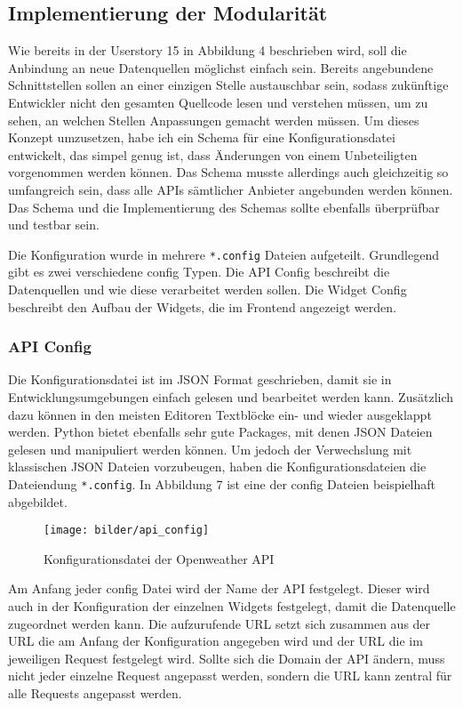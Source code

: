 \subsection{Implementierung der Modularität}
Wie bereits in der Userstory 15 in Abbildung 4 beschrieben wird, soll die Anbindung an neue Datenquellen möglichst einfach sein. Bereits angebundene Schnittstellen sollen an einer einzigen Stelle austauschbar sein, sodass zukünftige Entwickler nicht den gesamten Quellcode lesen und verstehen müssen, um zu sehen, an welchen Stellen Anpassungen gemacht werden müssen. Um dieses Konzept umzusetzen, habe ich ein Schema für eine Konfigurationsdatei entwickelt, das simpel genug ist, dass Änderungen von einem Unbeteiligten vorgenommen werden können. Das Schema musste allerdings auch gleichzeitig so umfangreich sein, dass alle APIs sämtlicher Anbieter angebunden werden können. Das Schema und die Implementierung des Schemas sollte ebenfalls überprüfbar und testbar sein. 

Die Konfiguration wurde in mehrere \texttt{*.config} Dateien aufgeteilt. Grundlegend gibt es zwei verschiedene config Typen. Die API Config beschreibt die Datenquellen und wie diese verarbeitet werden sollen. Die Widget Config beschreibt den Aufbau der Widgets, die im Frontend angezeigt werden.

\subsubsection{API Config}

Die Konfigurationsdatei ist im JSON Format geschrieben, damit sie in Entwicklungsumgebungen einfach gelesen und bearbeitet werden kann. Zusätzlich dazu können in den meisten Editoren Textblöcke ein- und wieder ausgeklappt werden. Python bietet ebenfalls sehr gute Packages, mit denen JSON Dateien gelesen und manipuliert werden können. Um jedoch der Verwechslung mit klassischen JSON Dateien vorzubeugen, haben die Konfigurationsdateien die Dateiendung \texttt{*.config}. In Abbildung 7 ist eine der config Dateien beispielhaft abgebildet. 

\begin{figure}[H]
  \centering
    \texttt{[image: bilder/api\_config]}
    \caption{Konfigurationsdatei der Openweather API}
\end{figure}

Am Anfang jeder config Datei wird der Name der API festgelegt. Dieser wird auch in der Konfiguration der einzelnen Widgets festgelegt, damit die Datenquelle zugeordnet werden kann. Die aufzurufende URL setzt sich zusammen aus der URL die am Anfang der Konfiguration angegeben wird und der URL die im jeweiligen Request festgelegt wird. Sollte sich die Domain der API ändern, muss nicht jeder einzelne Request angepasst werden, sondern die URL kann zentral für alle Requests angepasst werden. 

